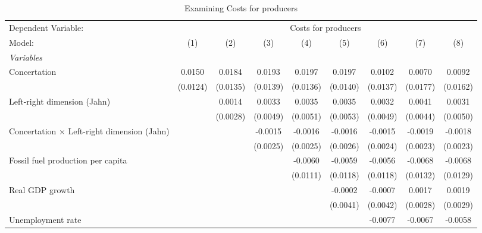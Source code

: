 
\begin{table}[htbp]
   \caption{Examining Costs for producers}
   \centering
   \begin{tabular}{lcccccccc}
      \tabularnewline \midrule \midrule
      Dependent Variable: & \multicolumn{8}{c}{Costs for producers}\\
      Model:                                             & (1)      & (2)      & (3)      & (4)      & (5)      & (6)      & (7)      & (8)\\  
      \midrule
      \emph{Variables}\\
      Concertation                                       & 0.0150   & 0.0184   & 0.0193   & 0.0197   & 0.0197   & 0.0102   & 0.0070   & 0.0092\\   
                                                         & (0.0124) & (0.0135) & (0.0139) & (0.0136) & (0.0140) & (0.0137) & (0.0177) & (0.0162)\\   
      Left-right dimension (Jahn)                        &          & 0.0014   & 0.0033   & 0.0035   & 0.0035   & 0.0032   & 0.0041   & 0.0031\\   
                                                         &          & (0.0028) & (0.0049) & (0.0051) & (0.0053) & (0.0049) & (0.0044) & (0.0050)\\   
      Concertation $\times$ Left-right dimension (Jahn)  &          &          & -0.0015  & -0.0016  & -0.0016  & -0.0015  & -0.0019  & -0.0018\\   
                                                         &          &          & (0.0025) & (0.0025) & (0.0026) & (0.0024) & (0.0023) & (0.0023)\\   
      Fossil fuel production per capita                  &          &          &          & -0.0060  & -0.0059  & -0.0056  & -0.0068  & -0.0068\\   
                                                         &          &          &          & (0.0111) & (0.0118) & (0.0118) & (0.0132) & (0.0129)\\   
      Real GDP growth                                    &          &          &          &          & -0.0002  & -0.0007  & 0.0017   & 0.0019\\   
                                                         &          &          &          &          & (0.0041) & (0.0042) & (0.0028) & (0.0029)\\   
      Unemployment rate                                  &          &          &          &          &          & -0.0077  & -0.0067  & -0.0058\\   

\end{tabular}
\end{table}

